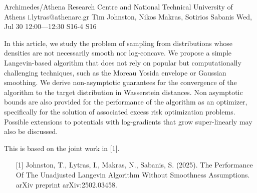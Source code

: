 \begin{talk}
  {Archimedes/Athena Research Centre and National Technical University of Athens}%
  {i.lytras@athenarc.gr}%
  {Tim Johnston, Nikos Makras, Sotirios Sabanis}%
  {}%
  {}%
  {}%
  {Wed, Jul 30 12:00---12:30}%
  {S16-4}%
  {S16}%
  
    
   
In this article, we study the problem of sampling from distributions whose densities are not necessarily smooth nor log-concave. We propose a simple Langevin-based algorithm that does not rely on popular but computationally challenging techniques, such as the Moreau Yosida envelope or Gaussian smoothing. We derive non-asymptotic guarantees for the convergence of the algorithm to the target distribution in Wasserstein distances. Non asymptotic bounds are also provided for the performance of the algorithm as an optimizer, specifically for the solution of associated excess risk optimization problems.\\
Possible extensions to potentials with log-gradients that grow super-linearly may also be discussed.

This is based on the joint work in [1].
\medskip

\begin{enumerate}
    \item [{[1]}] Johnston, T., Lytras, I., Makras, N., Sabanis, S. (2025). The Performance Of The Unadjusted Langevin Algorithm Without Smoothness Assumptions. arXiv preprint arXiv:2502.03458.
\end{enumerate}
\end{talk}

